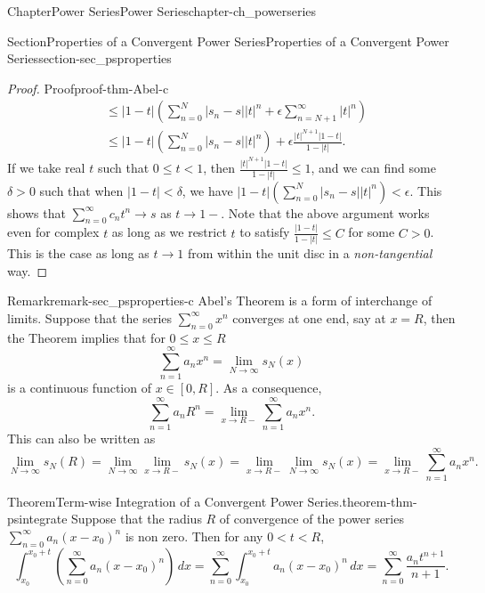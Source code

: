 \documentclass[oneside,10pt,]{book}
\numberwithin{equation}{section}
\newcommand{\lt}{<}
\newcommand{\gt}{>}
\newcommand{\amp}{&}
\begin{document}
\begin{chapterptx}{Chapter}{Power Series}{}{Power Series}{}{}{chapter-ch_powerseries}
\begin{sectionptx}{Section}{Properties of a Convergent Power Series}{}{Properties of a Convergent Power Series}{}{}{section-sec_psproperties}
\begin{proof}{Proof}{}{proof-thm-Abel-c}
\begin{align*}
\amp \le |1-t|\left( \sum_{n=0}^{N} \vert s_{n}-s \vert |t|^{n} + \epsilon \sum_{n=N+1}^{\infty} |t|^{n}\right)\\
\amp \le |1-t|\left( \sum_{n=0}^{N} \vert s_{n}-s \vert |t|^{n} \right) + \epsilon \frac{ |t|^{N+1} |1-t|}{1-|t|}.
\end{align*}
If we take real \(t\) such that \(0\le t \lt 1\), then \(\frac{ |t|^{N+1} |1-t|}{1-|t|} \le 1\), and we can find some \(\delta \gt 0\) such that when \(|1-t|\lt \delta\), we have \(|1-t|\left( \sum_{n=0}^{N} \vert s_{n}-s \vert |t|^{n} \right) \lt \epsilon\). This shows that \(\sum_{n=0}^{\infty} c_{n}t^{n} \to s\) as \(t\to 1-\). Note that the above argument works even for complex \(t\) as long as we restrict \(t\) to satisfy \(\frac{  |1-t|}{1-|t|} \le C\) for some \(C\gt 0\). This is the case as long as \(t\to 1\) from within the unit disc in a \emph{non-tangential} way.%
\end{proof}
\begin{remark}{Remark}{}{remark-sec_psproperties-c}%
Abel's Theorem is a form of interchange of limits. Suppose that the series \(\sum_{n=0}^{\infty} x^{n}\) converges at one end, say at \(x=R\), then the Theorem implies that for \(0\le x \le R\)%
\begin{equation*}
\sum_{n=1}^{\infty} a_n x^n =\lim_{N\to \infty} s_N(x)
\end{equation*}
is a continuous function of \(x\in [0,R]\). As a consequence,%
\begin{equation*}
\sum_{n=1}^{\infty} a_n R^n= \lim_{x\to R-} \sum_{n=1}^{\infty} a_n x^n\text{.}
\end{equation*}
This can also be written as%
\begin{equation*}
\lim_{N\to \infty} s_N(R)= \lim_{N\to \infty} \lim_{x\to R-} s_N(x) = \lim_{x\to R-} \lim_{N\to \infty} s_N(x) = \lim_{x\to R-} \sum_{n=1}^{\infty} a_n x^n.
\end{equation*}
%
\end{remark}
\begin{theorem}{Theorem}{Term-wise Integration of a Convergent Power Series.}{}{theorem-thm-psintegrate}%
Suppose that the radius \(R\) of convergence of the power series \(\sum_{n=0}^{\infty} a_{n}(x-x_{0})^{n}\) is non zero. Then for any \(0\lt t \lt R\),%
\begin{equation*}
\int_{x_{0}}^{x_{0}+t} \left( \sum_{n=0}^{\infty} a_{n}(x-x_{0})^{n} \right)\, dx =
\sum_{n=0}^{\infty}\int_{x_{0}}^{x_{0}+t} a_{n} (x-x_{0})^{n}\, dx =\sum_{n=0}^{\infty} \frac{a_{n}t^{n+1}}{n+1}.
\end{equation*}

\end{theorem}
\end{sectionptx}
\end{chapterptx}
\end{document}
